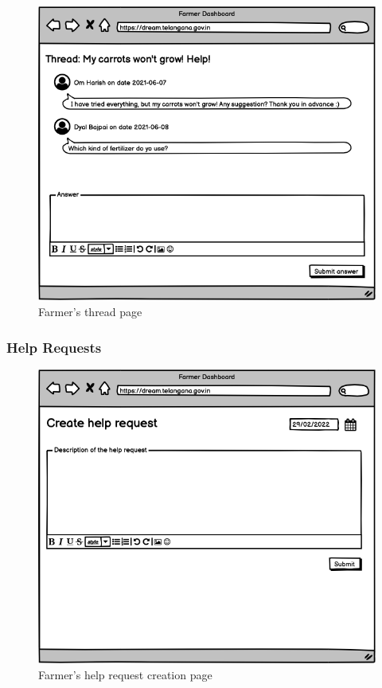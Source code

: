 \documentclass[10pt]{article} %
\begin{document}
\begin{figure}[h!]
    \centering
    \centerline{\includegraphics[scale=0.54]{images/uimockups/f_forumthread.png}}
    \caption{Farmer's thread page}
    \label{fig:ui_f_forumthread}
\end{figure}
\newpage

\subsubsection{Help Requests}
\begin{figure}[h!]
    \centering
    \centerline{\includegraphics[scale=0.54]{images/uimockups/f_helprequest.png}}
    \caption{Farmer's help request creation page}
    \label{fig:ui_f_helprequest}
\end{figure}
\newpage
\end{document}
